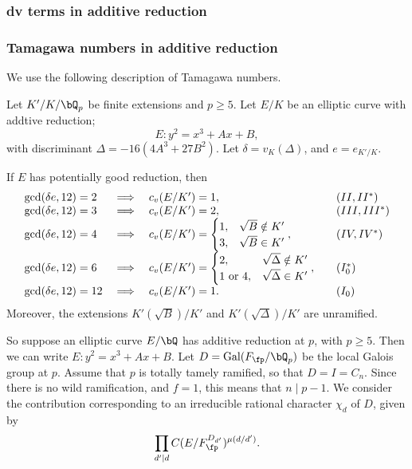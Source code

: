 \subsubsection*{dv terms in additive reduction}


\subsubsection*{Tamagawa numbers in additive reduction}

We use the following description of Tamagawa numbers. %

\begin{lemma}
    Let $K' /K / \bQ_p$ be finite extensions and $p \geq 5$. Let $E / K$ be an elliptic curve with addtive reduction; 
    \[ E \colon y^2 = x^3 + Ax + B, \]
    with discriminant $\Delta = -16(4 A^3 + 27 B^2)$. Let $\delta = v_K(\Delta)$, and $e = e_{K' / K}$.

    If $E$ has potentially good reduction, then 
        \[
        \begin{array}{l l l l}
            \gcd(\delta e, 12) = 2 & \implies & c_v(E / K') = 1, & \quad (II, II^*) \\
            \gcd(\delta e, 12) = 3 & \implies & c_v(E / K') = 2, & \quad (III, III^*) \\
            \gcd(\delta e, 12) = 4 & \implies & c_v(E / K') = \begin{cases} 1, & \sqrt{B} \notin K'
                                \\ 3, & \sqrt{B} \in K' \end{cases}, & \quad (IV, IV^*) \\
            \gcd(\delta e, 12) = 6 & \implies & c_v(E / K') = \begin{cases} 2, & \sqrt{\Delta} \notin K'
                \\ 1 \ \text{or} \ 4, & \sqrt{\Delta} \in K' \end{cases}, & \quad (I_0^*) \\
            \gcd(\delta e, 12) = 12 & \implies & c_v(E / K') = 1. & \quad (I_0)
        \end{array}
        \]
    Moreover, the extensions $K'(\sqrt{B}) / K'$ and $K'(\sqrt{\Delta}) / K'$ are unramified.
\end{lemma}

So suppose an elliptic curve $E / \bQ$ has additive reduction at $p$, with $p \geq 5$. Then we can write $E \colon y^2 = x^3 + Ax + B$. Let $D = \Gal(F_{\fp} / \bQ_p)$ be the local Galois group at $p$. Assume that $p$ is totally tamely ramified, so that $D = I = C_n$. Since there is no wild ramification, and $f = 1$, this means that $n \mid p - 1$. We consider the contribution corresponding to an irreducible rational character $\chi_d$ of $D$, given by 
\begin{equation}\label{tam-contrib}
\prod_{d ' \mid d} C(E / F_{\fp}^{D_{d'}})^{\mu(d / d')}.
\end{equation}

